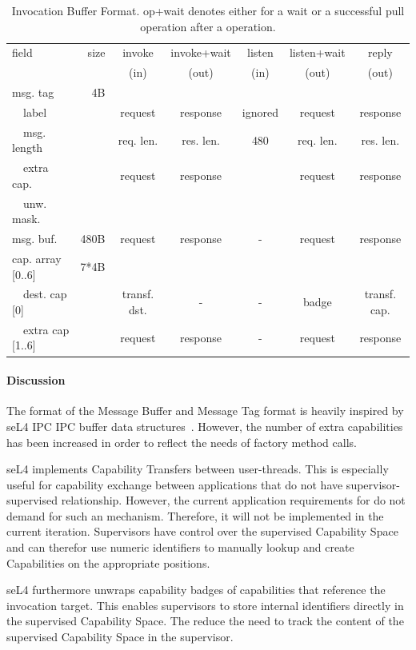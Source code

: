 \begin{table}
\begin{tabular}{lr|ccccc}
\toprule
field & size & invoke & invoke+wait & listen & listen+wait & reply  \\
 & & (in) & (out) & (in) & (out) & (out) \\
\midrule
msg. tag & 4B \\
~~label & & request & response & ignored & request & response \\
~~msg. length & & req. len. & res. len. &  480 & req. len. & res. len.\\
~~extra cap. & & request & response &  & request & response \\
~~unw. mask. & &  &  &  &  &  \\
\midrule
msg. buf. & 480B & request & response & - & request & response \\
\midrule
cap. array [0..6] & 7*4B \\
~~dest. cap [0] & & transf. dst. & - & - & badge & transf. cap. \\
~~extra cap [1..6] & & request & response & - & request & response \\
\bottomrule
\end{tabular}
\caption{Invocation Buffer Format. op+wait denotes either for a wait or a successful pull operation after a operation. }
\label{tab:invocation-format}
\end{table}

\paragraph{Discussion}
The format of the Message Buffer and Message Tag format is heavily inspired by seL4 IPC IPC buffer data structures~\cite{GrosvenorWalker2016}.
However, the number of extra capabilities has been increased in order to reflect the needs of factory method calls.

seL4 implements Capability Transfers between user-threads.
This is especially useful for capability exchange between applications that do not have supervisor-supervised relationship.
However, the current application requirements for \mythos do not demand for such an mechanism. Therefore, it will not be implemented in the current iteration. Supervisors have control over the supervised Capability Space and can therefor use numeric identifiers to manually lookup and create Capabilities on the appropriate positions.

seL4 furthermore unwraps capability badges of capabilities that reference the invocation target. This enables supervisors to store internal identifiers directly in the supervised Capability Space. The reduce the need to track the content of the supervised Capability Space in the supervisor.


